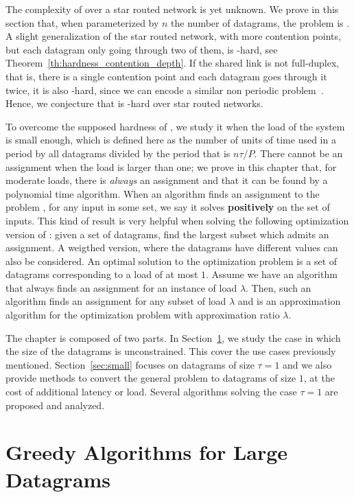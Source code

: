 The complexity of \pazl over a star routed network is yet unknown. We prove in this section that, when parameterized by
$n$ the number of datagrams, the problem is \FPT. A slight generalization of the star routed network, with more contention points, but each datagram only going through two of them, is \NP-hard, see Theorem~\ref{th:hardness_contention_depth}. If the shared link is not full-duplex, that is, there is a single contention point and each datagram goes through it twice, it is also \NP-hard, since we can encode a similar non periodic problem~\cite{orman1997complexity}. Hence, we conjecture that \pazl is \NP-hard over star routed networks.

To overcome the supposed hardness of \pazl, we study it when the load of the system is small enough, which is defined here as
the number of units of time used in a period by all datagrams divided by the period that is $n\tau /P$. There cannot be an assignment when the load is larger than one; we prove in this chapter that, for moderate loads, there is \emph{always} an assignment and that it can be found by a polynomial time algorithm. When an algorithm finds an assignment to the problem \pazl, for any input in some set,
we say it solves \pazl \textbf{positively} on the set of inputs. This kind of result is very helpful when solving the following optimization version of \pazl: given a set of datagrams, find the largest subset which admits an assignment. A weigthed version, where the datagrams have different values can also be considered. An optimal solution to the optimization problem is a set of datagrams corresponding to a load of at most $1$. Assume we have an algorithm that always finds an assignment for an instance of load $\lambda$. Then, such an algorithm finds an assignment for any subset of load $\lambda$ and is an approximation algorithm for the optimization problem with approximation ratio $\lambda$.

The chapter is composed of two parts. In Section~\ref{sec:large}, we study the case in which the size of the datagrams is unconstrained. This cover the use cases previously mentioned. Section~\ref{sec:small} focuses on datagrams of size $\tau = 1$ and we also provide methods to convert the general problem to datagrams of size $1$, at the cost of additional latency or load. Several algorithms solving the case $\tau = 1$ are proposed and analyzed.

\section{Greedy Algorithms for Large Datagrams} \label{sec:large}

